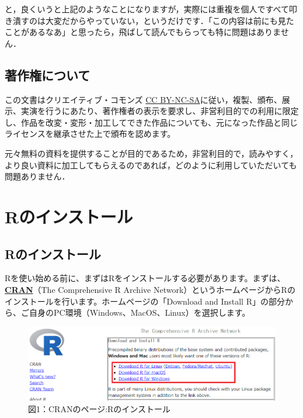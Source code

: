 \documentclass[
  letterpaper,
  DIV=11,
  numbers=noendperiod]{scrreprt}
\begin{document}
と，良くいうと上記のようなことになりますが，実際には重複を個人ですべて叩き潰すのは大変だからやっていない，というだけです．「この内容は前にも見たことがあるなあ」と思ったら，飛ばして読んでもらっても特に問題はありません．

\hypertarget{ux8457ux4f5cux6a29ux306bux3064ux3044ux3066}{%
\section*{著作権について}\label{ux8457ux4f5cux6a29ux306bux3064ux3044ux3066}}


この文書はクリエイティブ・コモンズ
\href{https://creativecommons.org/licenses/by-nc-sa/4.0/deed.ja}{CC
BY-NC-SA}に従い，複製、頒布、展示、実演を行うにあたり、著作権者の表示を要求し、非営利目的での利用に限定し、作品を改変・変形・加工してできた作品についても、元になった作品と同じライセンスを継承させた上で頒布を認めます。

元々無料の資料を提供することが目的であるため，非営利目的で，読みやすく，より良い資料に加工してもらえるのであれば，どのように利用していただいても問題ありません．


\hypertarget{rux306eux30a4ux30f3ux30b9ux30c8ux30fcux30eb}{%
\chapter{Rのインストール}\label{rux306eux30a4ux30f3ux30b9ux30c8ux30fcux30eb}}

\hypertarget{rux306eux30a4ux30f3ux30b9ux30c8ux30fcux30eb-1}{%
\section{Rのインストール}\label{rux306eux30a4ux30f3ux30b9ux30c8ux30fcux30eb-1}}

Rを使い始める前に、まずはRをインストールする必要があります。まずは、\href{https://cran.r-project.org/}{\textbf{CRAN}}（The
Comprehensive R Archive
Network）というホームページからRのインストールを行います。ホームページの「Download
and Install
R」の部分から、ご自身のPC環境（Windows、MacOS、Linux）を選択します。

\begin{figure}

{\centering \includegraphics{././image/CRAN_install1.png}

}

\caption{図1：CRANのページ:Rのインストール}

\end{figure}
\end{document}
